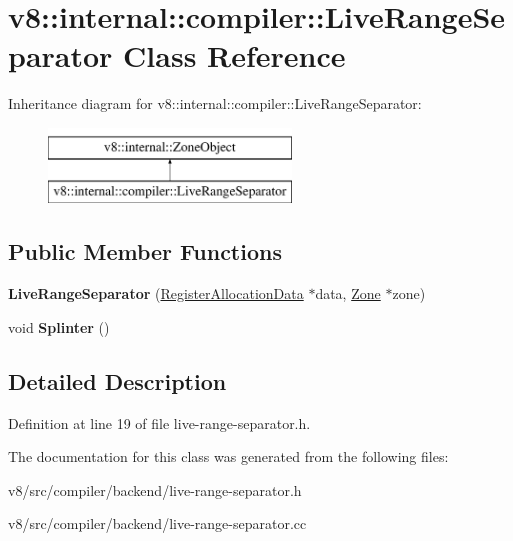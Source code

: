 \hypertarget{classv8_1_1internal_1_1compiler_1_1LiveRangeSeparator}{}\section{v8\+:\+:internal\+:\+:compiler\+:\+:Live\+Range\+Separator Class Reference}
\label{classv8_1_1internal_1_1compiler_1_1LiveRangeSeparator}
Inheritance diagram for v8\+:\+:internal\+:\+:compiler\+:\+:Live\+Range\+Separator\+:\begin{figure}[H]
\begin{center}
\leavevmode
\includegraphics[height=2.000000cm]{classv8_1_1internal_1_1compiler_1_1LiveRangeSeparator}
\end{center}
\end{figure}
\subsection*{Public Member Functions}
\begin{DoxyCompactItemize}
\item 
\mbox{\label{classv8_1_1internal_1_1compiler_1_1LiveRangeSeparator_a140d2e4341e2ff0aa774459164943b6c}} 
{\bfseries Live\+Range\+Separator} (\mbox{\hyperlink{classv8_1_1internal_1_1compiler_1_1RegisterAllocationData}{Register\+Allocation\+Data}} $\ast$data, \mbox{\hyperlink{classv8_1_1internal_1_1Zone}{Zone}} $\ast$zone)
\item 
\mbox{\label{classv8_1_1internal_1_1compiler_1_1LiveRangeSeparator_a4ffdf3b613bbda7370f15a3fd5139f1a}} 
void {\bfseries Splinter} ()
\end{DoxyCompactItemize}


\subsection{Detailed Description}


Definition at line 19 of file live-\/range-\/separator.\+h.



The documentation for this class was generated from the following files\+:\begin{DoxyCompactItemize}
\item 
v8/src/compiler/backend/live-\/range-\/separator.\+h\item 
v8/src/compiler/backend/live-\/range-\/separator.\+cc\end{DoxyCompactItemize}

